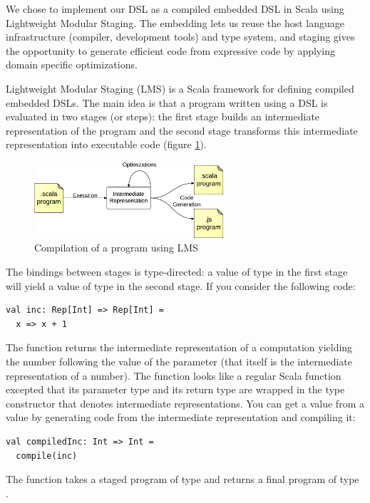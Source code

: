 \documentclass[american,english,runningheads]{llncs}
\begin{document}
We chose to implement our DSL as a compiled embedded DSL in Scala using Lightweight Modular Staging. The embedding lets us reuse the host language infrastructure (compiler, development tools) and type system, and staging gives the opportunity to generate efficient code from expressive code by applying domain specific optimizations.

Lightweight Modular Staging (LMS) is a Scala framework for defining compiled embedded DSLs. The main idea is that a program written using a DSL is evaluated in two stages (or steps): the first stage builds an intermediate representation of the program and the second stage transforms this intermediate representation into executable code (figure \ref{lms-diagram}).

\begin{figure}
  \centering
  \includegraphics[width=7cm]{lms.pdf}
  \caption{Compilation of a program using LMS}
  \label{lms-diagram}
\end{figure}

The bindings between stages is type-directed: a value of type  in the first stage will yield a value of type  in the second stage. If you consider the following code:
\begin{lstlisting}
val inc: Rep[Int] => Rep[Int] =
  x => x + 1
\end{lstlisting}
The  function returns the intermediate representation of a computation yielding the number following the value of the parameter  (that itself is the intermediate representation of a number). The function looks like a regular Scala function excepted that its parameter type and its return type are wrapped in the  type constructor that denotes intermediate representations. You can get a  value from a  value by generating code from the intermediate representation and compiling it:
\begin{lstlisting}
val compiledInc: Int => Int =
  compile(inc)
\end{lstlisting}
The  function takes a staged program of type  and returns a final program of type .
\end{document}
